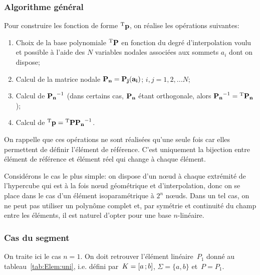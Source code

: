 \medskip
\subsubsection{Algorithme général}

Pour construire les fonction de forme ${}^\mathrm{T}\mathbf{p}$, on réalise les opérations suivantes:
\begin{enumerate}
   \item Choix de la base polynomiale ${}^\mathrm{T}\mathbf{P}$ en fonction du degré d'interpolation voulu et possible à l'aide des $N$ variables nodales associées aux sommets $a_i$ dont on dispose;
   \item Calcul de la matrice nodale $\MM{P_n}=\MM{P_j(a_i)}$; $i,j=1, 2, ... N$;
   \item Calcul de $\MMI{P_n}$ (dans certains cas, $\MM{P_n}$ étant orthogonale, alors $\MMI{P_n}=\MMT{P_n}$);
   \item Calcul de $\LL{p}=\LL{P}\MMI{P_n}$.
\end{enumerate}
On rappelle que ces opérations ne sont réalisées qu'une seule fois car elles permettent de définir l'élément de référence. C'est uniquement la bijection entre élément de référence et élément réel qui change à chaque élément.

\medskip
Considérons le cas le plus simple: on dispose d'un nœud à chaque extrémité de l'hypercube qui est à la fois nœud géométrique et d'interpolation, donc on se place dans le cas d'un élément isoparamétrique à $2^n$ nœuds.
Dans un tel cas, on ne peut pas utiliser un polynôme complet et, par symétrie et continuité du champ entre les éléments, il est naturel d'opter pour une base $n$-linéaire.

\medskip
\subsubsection{Cas du segment}

On traite ici le cas $n=1$.
On doit retrouver l'élément linéaire~$P_1$ donné au tableau~\ref{tab:Elem:uni}, i.e. défini par~$K= \mathopen{[}a\,;b\mathclose{]}$, $\Sigma=\{a,b\}$ et~$P= P_1$.

